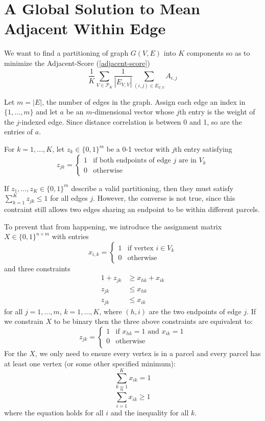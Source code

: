 \section{A Global Solution to Mean Adjacent Within Edge}

We want to find a partitioning of graph $G(V,E)$ into $K$ components
so as to minimize the Adjacent-Score (\ref{adjacent-score})
\[ \frac{1}{K} \sum_{V \in \mathcal{P}_K}
   \frac{1}{|E_{V,V}|} \sum_{(i,j) \in E_{V,V}} A_{i,j}
\]

Let $m = |E|$, the number of edges in the graph. Assign each edge an
index in $\{1, ..., m\}$ and 
let $a$ be an $m$-dimensional vector whose $j$th entry is the weight of
the $j$-indexed edge. Since distance correlation is between 0 and 1, so
are the entries of $a$.

For $k = 1, ..., K$, let $z_k \in \{0, 1\}^m$ be a 0-1 vector with
$j$th entry satisfying
\[ z_{jk} = \begin{cases}
  1 & \text{if both endpoints of edge } j \text{ are in } V_k \\
  0 & \text{otherwise}
\end{cases} \]

If $z_1, ..., z_K \in \{0, 1\}^m$ describe a valid partitioning, then
they must satisfy $\sum_{k=1}^K z_{jk} \leq 1$ for all edges $j$.
However, the converse is not true, since this contraint still allows two
edges sharing an endpoint to be within different parcels.

To prevent that from happening, we introduce the assignment matrix
$X \in \{0, 1\}^{n \times m}$ with entries
\[ x_{i,k} = \begin{cases}
  1 & \text{if vertex } i \in V_k \\
  0 & \text{otherwise}
\end{cases} \]
and three constraints
\begin{align*}
1 + z_{jk} &\geq x_{hk} + x_{ik} \\
z_{jk} &\leq x_{hk} \\
z_{jk} &\leq x_{ik}
\end{align*}
for all $j = 1, ..., m$, $k = 1, ..., K$, where $(h,i)$ are the two
endpoints of edge $j$. If we constrain $X$ to be binary then the three
above constraints are equivalent to:
\[ z_{jk} = \begin{cases}
  1 & \text{if } x_{hk} = 1 \text{ and } x_{ik} = 1 \\
  0 & \text{otherwise} \\
\end{cases}\]
For the $X$, we only need to ensure every vertex is in a parcel and every
parcel has at least one vertex (or some other specified minimum):
\[ \sum_{k=1}^K x_{ik} = 1 \]
\[ \sum_{i=1}^n x_{ik} \geq 1 \]
where the equation holds for all $i$ and the inequality for all $k$.

